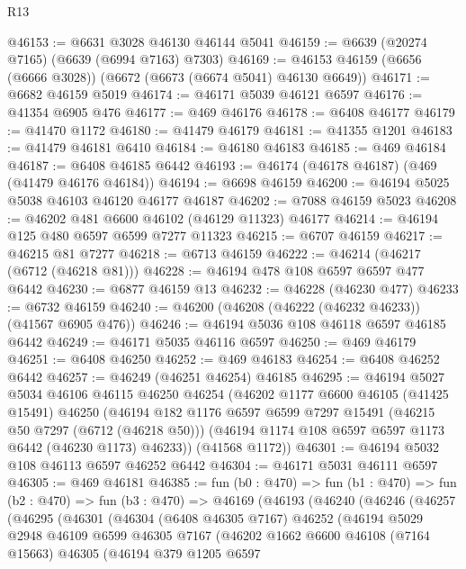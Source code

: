 \begin{lexlean}{R13}
\begin{coremodule}
@46153 := @6631 @3028 @46130 @46144 @5041
@46159 := @6639 (@20274 @7165) (@6639 (@6994 @7163) @7303)
@46169 := @46153 @46159 (@6656 (@6666 @3028)) (@6672 (@6673 (@6674 @5041) @46130 @6649))
@46171 := @6682 @46159 @5019
@46174 := @46171 @5039 @46121 @6597
@46176 := @41354 @6905 @476
@46177 := @469 @46176
@46178 := @6408 @46177
@46179 := @41470 @1172
@46180 := @41479 @46179
@46181 := @41355 @1201
@46183 := @41479 @46181 @6410
@46184 := @46180 @46183
@46185 := @469 @46184
@46187 := @6408 @46185 @6442
@46193 := @46174 (@46178 @46187) (@469 (@41479 @46176 @46184))
@46194 := @6698 @46159
@46200 := @46194 @5025 @5038 @46103 @46120 @46177 @46187
@46202 := @7088 @46159 @5023
@46208 := @46202 @481 @6600 @46102 (@46129 @11323) @46177
@46214 := @46194 @125 @480 @6597 @6599 @7277 @11323
@46215 := @6707 @46159
@46217 := @46215 @81 @7277
@46218 := @6713 @46159
@46222 := @46214 (@46217 (@6712 (@46218 @81)))
@46228 := @46194 @478 @108 @6597 @6597 @477 @6442
@46230 := @6877 @46159 @13
@46232 := @46228 (@46230 @477)
@46233 := @6732 @46159
@46240 := @46200 (@46208 (@46222 (@46232 @46233)) (@41567 @6905 @476))
@46246 := @46194 @5036 @108 @46118 @6597 @46185 @6442
@46249 := @46171 @5035 @46116 @6597
@46250 := @469 @46179
@46251 := @6408 @46250
@46252 := @469 @46183
@46254 := @6408 @46252 @6442
@46257 := @46249 (@46251 @46254) @46185
@46295 := @46194
    @5027
    @5034
    @46106
    @46115
    @46250
    @46254
    (@46202
      @1177
      @6600
      @46105
      (@41425 @15491)
      @46250
      (@46194
        @182
        @1176
        @6597
        @6599
        @7297
        @15491
        (@46215 @50 @7297 (@6712 (@46218 @50)))
        (@46194 @1174 @108 @6597 @6597 @1173 @6442 (@46230 @1173) @46233))
      (@41568 @1172))
@46301 := @46194 @5032 @108 @46113 @6597 @46252 @6442
@46304 := @46171 @5031 @46111 @6597
@46305 := @469 @46181
@46385 := fun (b0 : @470) =>
  fun (b1 : @470) =>
  fun (b2 : @470) =>
  fun (b3 : @470) =>
  @46169
    (@46193
      (@46240
        (@46246
          (@46257
            (@46295
              (@46301
                (@46304
                  (@6408 @46305 @7167)
                  @46252
                  (@46194
                    @5029
                    @2948
                    @46109
                    @6599
                    @46305
                    @7167
                    (@46202
                      @1662
                      @6600
                      @46108
                      (@7164 @15663)
                      @46305
                      (@46194
                        @379
                        @1205
                        @6597

\end{coremodule}
\end{lexlean}
